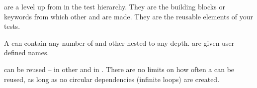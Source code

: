 \label{testcase} 

\gdcases{} are a level up from \gdsteps{} in the test hierarchy. They are the building blocks or keywords from which other \gdcases{} and \gdsuites{} are made. They are the reusable elements of your tests. 

A \gdcase{} can contain any number of \gdsteps{} and other
 \gdcases{} nested to any depth. \gdcases{} are given user-defined names.  

 \gdcases{} can be reused -- in other \gdcases{} and in \gdsuites{}. There are no limits on how often a \gdcase{} can be reused, as long as no  circular 
dependencies (infinite loops) are created.
 
